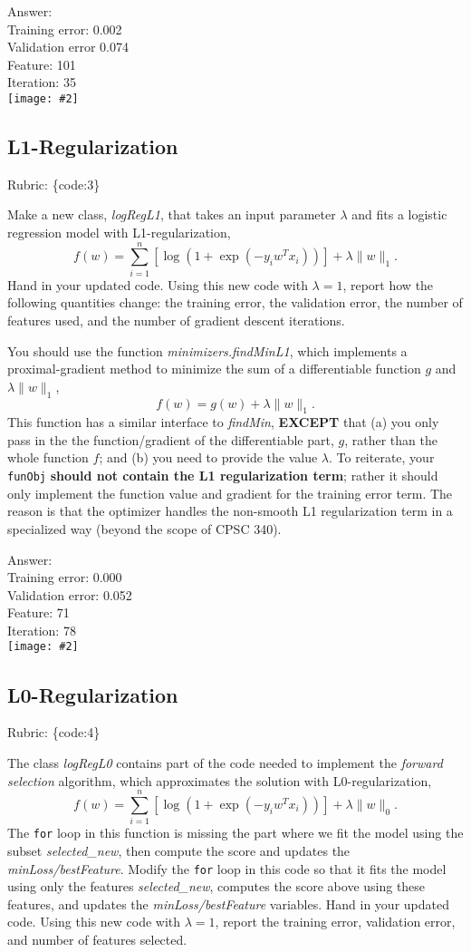 \documentclass{article}
\def\rubric#1{\gre{Rubric: \{#1\}}}{}
\def\ans#1{\par\gre{Answer: #1}}
\def\blu#1{{\color{blu}#1}}
\def\gre#1{{\color{gre}#1}}
\def\norm#1{\|#1\|}
\newcommand{\fig}[2]{\texttt{[image: \#2]}}
\begin{document}
\ans{\\
	Training error: 0.002\\
	Validation error 0.074\\
	Feature: 101\\
	Iteration: 35
}\\
\fig{1}{../figs/L2}

\subsection{L1-Regularization}
\rubric{code:3}

Make a new class, \emph{logRegL1}, that takes an input parameter $\lambda$ and fits a logistic regression model with L1-regularization,
\[
f(w) = \sum_{i=1}^n \left[\log(1+\exp(-y_iw^Tx_i))\right] + \lambda\norm{w}_1.
\]
\blu{Hand in your updated code. Using this new code with $\lambda = 1$, report how the following quantities change: the training error, the validation error, the number of features used, and the number of gradient descent iterations.}

You should use the function \emph{minimizers.findMinL1}, which implements a
proximal-gradient method to minimize the sum of a differentiable function $g$ and $\lambda\norm{w}_1$,
\[
f(w) = g(w) + \lambda \norm{w}_1.
\]
This function has a similar interface to \emph{findMin}, \textbf{EXCEPT} that (a) you
only pass in the the function/gradient of the differentiable
part, $g$, rather than the whole function $f$; and (b) you need to provide the value $\lambda$.
To reiterate, your \texttt{funObj} \textbf{should not contain the L1 regularization term}; rather it
should only implement the function value and gradient for the training error term. The reason is that 
the optimizer handles the non-smooth L1 regularization term in a specialized way (beyond the scope of CPSC 340).

\ans{\\
	Training error: 0.000\\
	Validation error: 0.052\\
	Feature: 71\\
	Iteration: 78
}\\
\fig{1}{../figs/L1}

\subsection{L0-Regularization}
\rubric{code:4}

The class \emph{logRegL0} contains part of the code needed to implement the \emph{forward selection} algorithm,
which approximates the solution with L0-regularization,
\[
f(w) =  \sum_{i=1}^n \left[\log(1+\exp(-y_iw^Tx_i))\right] + \lambda\norm{w}_0.
\]
The \texttt{for} loop in this function is missing the part where we fit the model using the subset \emph{selected\_new},
then compute the score and updates the \emph{minLoss/bestFeature}.
Modify the \texttt{for} loop in this code so that it fits the model using only
the features \emph{selected\_new}, computes the score above using these features,
and updates the \emph{minLoss/bestFeature} variables.
\blu{Hand in your updated code. Using this new code with $\lambda=1$,
report the training error, validation error, and number of features selected.}
\end{document}
